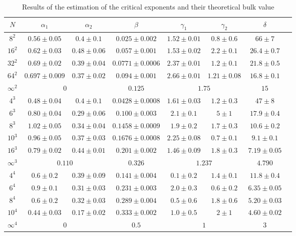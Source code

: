 \documentclass[a4paper, 11pt]{article}
\begin{document}
    \begin{table}[H]
      \centering
      \begin{tabular}{c|ccccccc}
        \toprule
        $N$ & $\alpha_1$ & $\alpha_2$ & $\beta$ & $\gamma_1$ & $\gamma_2$ & $\delta$ \\
        \midrule
        $8^2$ & $0.56 \pm 0.05$ & $0.4 \pm 0.1$ & $0.025 \pm 0.002$ & $1.52 \pm 0.01$ & $0.8 \pm 0.6$ & $66 \pm 7$\\
        $16^2$ & $0.62 \pm 0.03$ & $0.48 \pm 0.06$ & $0.057 \pm 0.001$ & $1.53 \pm 0.02$ & $2.2 \pm 0.1$ & $26.4 \pm 0.7$\\
        $32^2$ & $0.69 \pm 0.02$ & $0.39 \pm 0.04$ & $0.0771 \pm 0.0006$ & $2.37 \pm 0.01$ & $1.2 \pm 0.1$ & $21.8 \pm 0.5$\\
        $64^2$ & $0.697 \pm 0.009$ & $0.37 \pm 0.02$ & $0.094 \pm 0.001$ & $2.66 \pm 0.01$ & $1.21 \pm 0.08$ & $16.8 \pm 0.1$\\
        $\infty^2$ & \multicolumn{2}{c}{$0$} & $0.125$ & \multicolumn{2}{c}{$1.75$} & $15$\\
        \midrule
        $4^3$ & $0.48 \pm 0.04$ & $0.4 \pm 0.1$ & $0.0428 \pm 0.0008$ & $1.61 \pm 0.03$ & $1.2 \pm 0.3$ & $47 \pm 8$\\
        $6^3$ & $0.80 \pm 0.04$ & $0.29 \pm 0.06$ & $0.100 \pm 0.003$ & $2.1 \pm 0.1$ & $5 \pm 1$ & $17.9 \pm 0.4$\\
        $8^3$ & $1.02 \pm 0.05$ & $0.34 \pm 0.04$ & $0.1458 \pm 0.0009$ & $1.9 \pm 0.2$ & $1.7 \pm 0.3$ & $10.6 \pm 0.2$\\
        $10^3$ & $0.96 \pm 0.05$ & $0.37 \pm 0.03$ & $0.1676 \pm 0.0008$ & $2.25 \pm 0.08$ & $0.7 \pm 0.1$ & $9.1 \pm 0.1$\\
        $16^3$ & $0.79 \pm 0.02$ & $0.44 \pm 0.01$ & $0.201 \pm 0.002$ & $1.46 \pm 0.09$ & $1.8 \pm 0.3$ & $7.19 \pm 0.05$\\
        $\infty^3$ & \multicolumn{2}{c}{$0.110$} & $0.326$ & \multicolumn{2}{c}{$1.237$} & $4.790$\\
        \midrule
        $4^4$ & $0.6 \pm 0.2$ & $0.39 \pm 0.09$ & $0.141 \pm 0.004$ & $0.1 \pm 0.2$ & $1.4 \pm 0.1$ & $11.8 \pm 0.4$\\
        $6^4$ & $0.9 \pm 0.1$ & $0.31 \pm 0.03$ & $0.231 \pm 0.003$ & $2.0 \pm 0.3$ & $0.6 \pm 0.2$ & $6.35 \pm 0.05$\\
        $8^4$ & $0.6 \pm 0.2$ & $0.32 \pm 0.03$ & $0.289 \pm 0.004$ & $0.5 \pm 0.6$ & $1.8 \pm 0.6$ & $5.20 \pm 0.03$\\
        $10^4$ & $0.44 \pm 0.03$ & $0.17 \pm 0.02$ & $0.333 \pm 0.002$ & $1.0 \pm 0.5$ & $2 \pm 1$ & $4.60 \pm 0.02$\\
        $\infty^4$ & \multicolumn{2}{c}{$0$} & $0.5$ & \multicolumn{2}{c}{$1$} & $3$\\
        \bottomrule
      \end{tabular}
      \caption{Results of the estimation of the critical exponents and their theoretical bulk value}
      \label{tab:exponents}
    \end{table}
\end{document}
